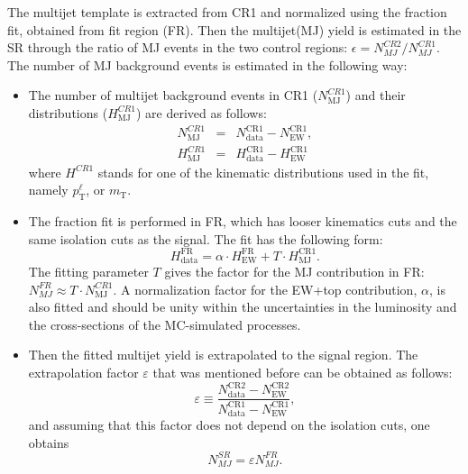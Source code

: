  The multijet template is extracted from CR1 and normalized using the fraction fit, obtained from fit region (FR). Then the multijet(MJ) yield is estimated in the SR through the ratio of MJ events in the two control regions: $\epsilon = N_{MJ}^{CR2}/N_{MJ}^{CR1}$.
 The number of MJ background events is estimated in the following way:
 \begin{itemize}
  \item The number of multijet background events in CR1 ($N_\text{MJ}^{CR1}$) and their distributions ($H_\text{MJ}^{CR1}$) are derived as follows:
 \begin{eqnarray}
 N_\text{MJ}^{CR1} &=&  N_\text{data}^\text{CR1}-N_\text{EW}^\text{CR1},\\ 
 H_\text{MJ}^{CR1} &=&  H_\text{data}^\text{CR1}-H_\text{EW}^\text{CR1} 
 \end{eqnarray}
 where $H^{CR1}$ stands for one of the kinematic distributions used in the fit, namely $p_\text{T}^\ell$, \met or $m_\text{T}$. 
 
 \item The fraction fit is performed in FR, which has looser kinematics cuts and the same isolation cuts as the signal. The fit has the following form:
 \begin{equation}
 H_\text{data}^\text{FR} = \alpha \cdot H_\text{EW}^\text{FR} + T \cdot H_\text{MJ}^\text{CR1}.
 \label{eq:mjfit1}
 \end{equation}
 The fitting parameter $T$ gives the factor for the MJ contribution in FR:  $N_{MJ}^{FR} \approx T \cdot N_\text{MJ}^{CR1}$. A normalization factor for the EW+top contribution, $\alpha$, is also fitted and should be unity within the uncertainties in the luminosity and the cross-sections of the MC-simulated processes.
 
 \item Then the fitted multijet yield is extrapolated to the signal region. The extrapolation factor $\varepsilon$ that was mentioned before can be obtained as follows:
 \begin{equation}
 \varepsilon \equiv \frac{N_\text{data}^\text{CR2}-N_\text{EW}^\text{CR2}}{N_\text{data}^\text{CR1}-N_\text{EW}^\text{CR1}},
 \label{eq:mjfit2}
 \end{equation}
 and assuming that this factor does not depend on the isolation cuts, one obtains
 \begin{equation}
 N_{MJ}^{SR} = \varepsilon N_{MJ}^{FR}.
 \end{equation}
\end{itemize}

